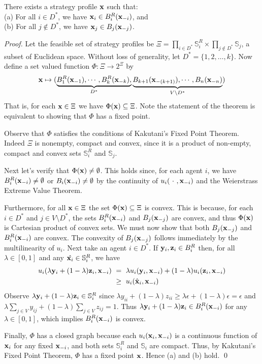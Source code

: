 \begin{thm}\label{thm: BR}
There exists a strategy profile ${\bf x}$ such that:\\
\indent (a) For all $i\in D^*$, we have ${\bf x}_i \in B^R_i({\bf x}_{-i})$, and\\
\indent (b) For all $j\notin D^*$, we have ${\bf x}_j \in B_j({\bf x}_{-j})$.
\end{thm}	
\begin{proof}
	
Let the feasible set of strategy profiles be $\Xi= \prod\limits_{i\in D^*} \mathbb{S}^R_i \times \prod\limits_{j\notin D^*} \mathbb{S}_j$, 
a subset of Euclidean space. 
Without loss of generality, let $D^*=\{1,2,\dots, k\}$.
Now define a set valued function $\Phi \colon \Xi \longrightarrow 2^\Xi$ by
$${\bf x} \mapsto ( \underbrace{B_1^R({\bf x}_{-1}),\cdots,B_k^R({\bf x}_{-k}),}_{D^*} \underbrace{B_{k+1}({\bf x}_{-(k+1)}),\cdots,B_n({\bf x}_{-n})}_{V\setminus D^*}    )$$	
That is, for each ${\bf x}\in \Xi$ we have $\Phi({\bf x})\subseteq \Xi$. Note the statement of the theorem is equivalent to showing that $\Phi$ has a fixed point. 
	
Observe that $\Phi$ satisfies the conditions of Kakutani's Fixed Point Theorem. Indeed $\Xi$ is nonempty, 
compact and convex, since it is a product of non-empty, compact and convex sets $\mathbb{S}^R_i$ and $\mathbb{S}_j$. 
	
Next let's verify that $\Phi({\bf x})\neq \emptyset$. This holds since, for each agent $i$,  we have $B^R_i({\bf x}_{-i})\neq \emptyset$ 
or $B_i({\bf x}_{-i})\neq \emptyset$ by the continuity of $u_i(\ \cdot \ ,{\bf x}_{-i})$ and the Weierstrass Extreme Value Theorem. 
	
Furthermore, for all ${\bf x}\in \Xi$ the set $\Phi({\bf x})\subseteq \Xi$ is convex. This is because, for each $i\in D^*$ 
and $j\in V\setminus D^*$, the sets $B^R_i({\bf x}_{-i})$ and $B_j({\bf x}_{-j})$ are convex, and thus $\Phi({\bf x})$ is Cartesian 
product of convex sets. We must now show that both $B_j({\bf x}_{-j})$ and $B^R_i({\bf x}_{-i})$ are convex.
The convexity of $B_j({\bf x}_{-j})$ follows immediately by the multilinearity of $u_i$. 
Next take an agent $i\in D^* $. If ${\bf y}_i,{\bf z}_i \in B^R_i$ then, 
for all $\lambda\in [0,1]$ and any $\hat{{\bf x}_i}\in \mathbb{S}^R_i$, we have
	\begin{align*}
	u_i(\lambda{\bf y}_i+(1-\lambda){\bf z}_i,{\bf x}_{-i}) &\ =\ \lambda u_i({\bf y}_i,{\bf x}_{-i}) + (1-\lambda)u_i({\bf z}_i,{\bf x}_{-i}) \\ 
	&\ \geq \ u_i (\hat{{\bf x}}_i,{\bf x}_{-i})
	\end{align*}
Observe $\lambda{\bf y}_i+(1-\lambda){\bf z}_i\in \mathbb{S}^R_i$ since $\lambda y_{ii}+(1-\lambda)z_{ii}\geq \lambda \epsilon +(1-\lambda)\epsilon = \epsilon$ 
and $\lambda\sum_{j\in V} y_{ij}+(1-\lambda)\sum_{j\in V} z_{ij} = 1  $. Thus $\lambda {\bf y}_i +(1-\lambda){\bf z}_i\in B^R_i({\bf x}_{-i})$ for 
any $\lambda\in [0,1]$, which implies $B^R_i({\bf x}_{-i})$ is convex.
	
Finally, $\Phi$ has a closed graph because each $u_i({\bf x}_i,{\bf x}_{-i})$ is a continuous function of ${\bf x}_i$ for any fixed ${\bf x}_{-i}$, and 
both sets $\mathbb{S}^R_i$ and $\mathbb{S}_i$ are compact. Thus, by Kakutani's Fixed Point Theorem, $\Phi$ 
has a fixed point ${\bf x}$. Hence (a) and (b) hold. \qed	
\end{proof}
